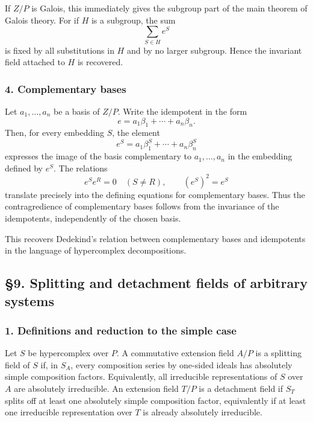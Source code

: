 \documentclass[
  11pt,
]{article}
\begin{document}
If \(Z/P\) is Galois, this immediately gives the subgroup part of the
main theorem of Galois theory. For if \(H\) is a subgroup, the sum \[
  \sum_{S\in H} e^S
\] is fixed by all substitutions in \(H\) and by no larger subgroup.
Hence the invariant field attached to \(H\) is recovered.

\subsubsection{4. Complementary bases}\label{complementary-bases}

Let \(a_1,
\ldots,a_n\) be a basis of \(Z/P\). Write the idempotent in the form \[
  e=a_1\beta_1+
\cdots+a_n\beta_n.
\] Then, for every embedding \(S\), the element \[
  e^S=a_1\beta_1^S+
\cdots+a_n\beta_n^S
\] expresses the image of the basis complementary to \(a_1,
\ldots,a_n\) in the embedding defined by \(e^S\). The relations \[
  e^Se^R=0\quad(S\ne R),
  \qquad (e^S)^2=e^S
\] translate precisely into the defining equations for complementary
bases. Thus the contragredience of complementary bases follows from the
invariance of the idempotents, independently of the chosen basis.

This recovers Dedekind's relation between complementary bases and
idempotents in the language of hypercomplex decompositions.

\subsection{§9. Splitting and detachment fields of arbitrary
systems}\label{splitting-and-detachment-fields-of-arbitrary-systems}

\subsubsection{1. Definitions and reduction to the simple
case}\label{definitions-and-reduction-to-the-simple-case}

Let \(S\) be hypercomplex over \(P\). A commutative extension field
\(A/P\) is a splitting field of \(S\) if, in \(S_A\), every composition
series by one-sided ideals has absolutely simple composition factors.
Equivalently, all irreducible representations of \(S\) over \(A\) are
absolutely irreducible. An extension field \(T/P\) is a detachment field
if \(S_T\) splits off at least one absolutely simple composition factor,
equivalently if at least one irreducible representation over \(T\) is
already absolutely irreducible.
\end{document}
